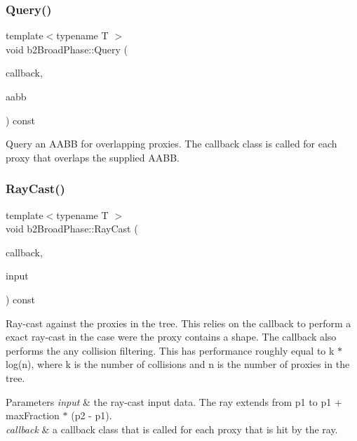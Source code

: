 \subsubsection{\texorpdfstring{Query()}{Query()}}
{\footnotesize\ttfamily template$<$typename T $>$ \\
void b2\+Broad\+Phase\+::\+Query (\begin{DoxyParamCaption}\item[{T $\ast$}]{callback,  }\item[{const \hyperlink{structb2_a_a_b_b}{b2\+A\+A\+BB} \&}]{aabb }\end{DoxyParamCaption}) const\hspace{0.3cm}{\ttfamily [inline]}}

Query an A\+A\+BB for overlapping proxies. The callback class is called for each proxy that overlaps the supplied A\+A\+BB. \mbox{\label{classb2_broad_phase_ae65392ea91c7d0839ed5312f78b2837a}} 
\subsubsection{\texorpdfstring{Ray\+Cast()}{RayCast()}}
{\footnotesize\ttfamily template$<$typename T $>$ \\
void b2\+Broad\+Phase\+::\+Ray\+Cast (\begin{DoxyParamCaption}\item[{T $\ast$}]{callback,  }\item[{const \hyperlink{structb2_ray_cast_input}{b2\+Ray\+Cast\+Input} \&}]{input }\end{DoxyParamCaption}) const\hspace{0.3cm}{\ttfamily [inline]}}

Ray-\/cast against the proxies in the tree. This relies on the callback to perform a exact ray-\/cast in the case were the proxy contains a shape. The callback also performs the any collision filtering. This has performance roughly equal to k $\ast$ log(n), where k is the number of collisions and n is the number of proxies in the tree. 
\begin{DoxyParams}{Parameters}
{\em input} & the ray-\/cast input data. The ray extends from p1 to p1 + max\+Fraction $\ast$ (p2 -\/ p1). \\
\hline
{\em callback} & a callback class that is called for each proxy that is hit by the ray. \\
\hline
\end{DoxyParams}
\mbox{\label{classb2_broad_phase_a410e6115e3d1b4fca61cfbf397767772}} 
